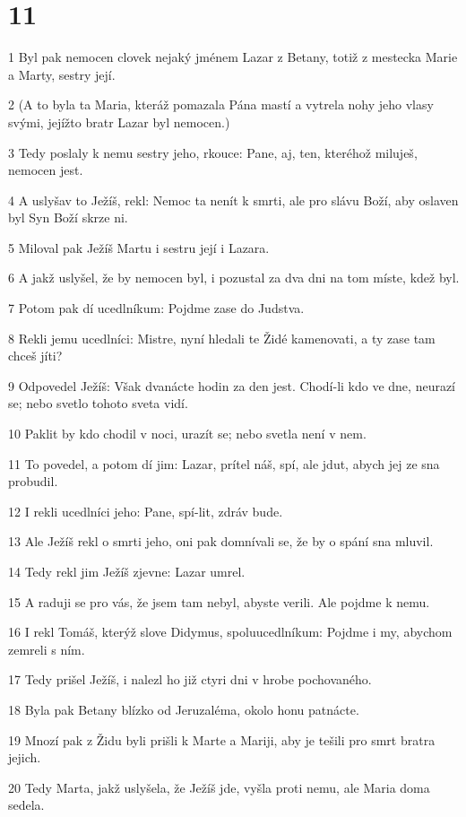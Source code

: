 \chapter{11}

\par 1 Byl pak nemocen clovek nejaký jménem Lazar z Betany, totiž z mestecka Marie a Marty, sestry její.
\par 2 (A to byla ta Maria, kteráž pomazala Pána mastí a vytrela nohy jeho vlasy svými, jejížto bratr Lazar byl nemocen.)
\par 3 Tedy poslaly k nemu sestry jeho, rkouce: Pane, aj, ten, kteréhož miluješ, nemocen jest.
\par 4 A uslyšav to Ježíš, rekl: Nemoc ta nenít k smrti, ale pro slávu Boží, aby oslaven byl Syn Boží skrze ni.
\par 5 Miloval pak Ježíš Martu i sestru její i Lazara.
\par 6 A jakž uslyšel, že by nemocen byl, i pozustal za dva dni na tom míste, kdež byl.
\par 7 Potom pak dí ucedlníkum: Pojdme zase do Judstva.
\par 8 Rekli jemu ucedlníci: Mistre, nyní hledali te Židé kamenovati, a ty zase tam chceš jíti?
\par 9 Odpovedel Ježíš: Však dvanácte hodin za den jest. Chodí-li kdo ve dne, neurazí se; nebo svetlo tohoto sveta vidí.
\par 10 Paklit by kdo chodil v noci, urazít se; nebo svetla není v nem.
\par 11 To povedel, a potom dí jim: Lazar, prítel náš, spí, ale jdut, abych jej ze sna probudil.
\par 12 I rekli ucedlníci jeho: Pane, spí-lit, zdráv bude.
\par 13 Ale Ježíš rekl o smrti jeho, oni pak domnívali se, že by o spání sna mluvil.
\par 14 Tedy rekl jim Ježíš zjevne: Lazar umrel.
\par 15 A raduji se pro vás, že jsem tam nebyl, abyste verili. Ale pojdme k nemu.
\par 16 I rekl Tomáš, kterýž slove Didymus, spoluucedlníkum: Pojdme i my, abychom zemreli s ním.
\par 17 Tedy prišel Ježíš, i nalezl ho již ctyri dni v hrobe pochovaného.
\par 18 Byla pak Betany blízko od Jeruzaléma, okolo honu patnácte.
\par 19 Mnozí pak z Židu byli prišli k Marte a Mariji, aby je tešili pro smrt bratra jejich.
\par 20 Tedy Marta, jakž uslyšela, že Ježíš jde, vyšla proti nemu, ale Maria doma sedela.
